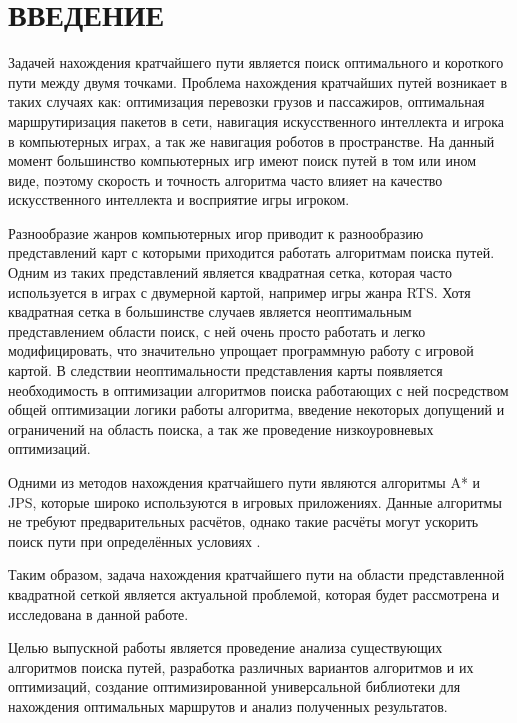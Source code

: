 \section*{ВВЕДЕНИЕ}

\vspace{1\baselineskip} 

Задачей нахождения кратчайшего пути является поиск оптимального и короткого пути между двумя точками. Проблема нахождения кратчайших путей возникает в таких случаях как: оптимизация перевозки грузов и пассажиров, оптимальная маршрутиризация пакетов в сети, навигация искусственного интеллекта и игрока в компьютерных играх, а так же навигация роботов в пространстве. На данный момент большинство компьютерных игр имеют поиск путей в том или ином виде, поэтому скорость и точность алгоритма часто влияет на качество искусственного интеллекта и восприятие игры игроком. 

Разнообразие жанров компьютерных игор приводит к разнообразию представлений карт с которыми приходится работать алгоритмам поиска путей. Одним из таких представлений является квадратная сетка, которая часто используется в играх с двумерной картой, например игры жанра RTS. Хотя квадратная сетка в большинстве случаев является неоптимальным представлением области поиск, с ней очень просто работать и легко модифицировать, что значительно упрощает программную работу с игровой картой. В следствии неоптимальности представления карты появляется необходимость в оптимизации алгоритмов поиска работающих с ней посредством общей оптимизации логики работы алгоритма, введение некоторых допущений и ограничений на область поиска, а так же проведение низкоуровневых оптимизаций.

Одними из методов нахождения кратчайшего пути являются алгоритмы A* и JPS, которые широко используются в игровых приложениях. Данные алгоритмы не требуют предварительных расчётов, однако такие расчёты могут ускорить поиск пути при определённых условиях \cite{PREPROCESSING}. 

Таким образом, задача нахождения кратчайшего пути на области представленной квадратной сеткой является актуальной проблемой, которая будет рассмотрена и исследована в данной работе.

Целью выпускной работы является проведение анализа существующих алгоритмов поиска путей, разработка различных вариантов алгоритмов и их оптимизаций, создание оптимизированной универсальной библиотеки для нахождения оптимальных маршрутов и анализ полученных результатов.


